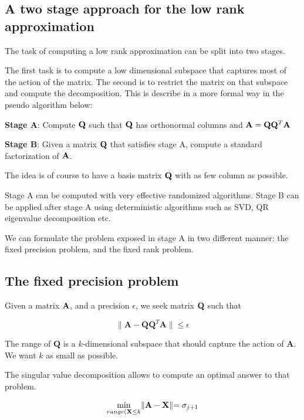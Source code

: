 \documentclass[onecolumn,12pt]{article}
\begin{document}
\subsection{A two stage approach for the low rank approximation}
The task of computing a low rank approximation can be split into two stages.

The first task is to compute a low dimensional subspace that captures most of
the action of the matrix. The second is to restrict the matrix on that subspace
and compute the decomposition. This is describe in a more formal way in the
pseudo algorithm below:

\textbf{Stage A}: Compute $\bold{Q}$ such that $\bold{Q}$ has orthonormal columns and
$\bold{A} = \bold{Q} \bold{Q}^T \bold{A}$

\textbf{Stage B}: Given a matrix $\bold{Q}$ that satisfies stage A, compute a standard
factorization of $\bold{A}$.

The idea is of course to have a basis matrix $\bold{Q}$ with as few column as possible.

Stage A can be computed with very effective randomized algorithms. Stage B can
be applied after stage A using deterministic algorithms such as SVD, QR
eigenvalue decomposition etc.

We can formulate the problem exposed in stage A in two different manner: the
fixed precision problem, and the fixed rank problem.

\subsection{The fixed precision problem}

Given a matrix $\bold{A}$, and a precision $\epsilon$, we seek matrix
$\bold{Q}$ such that

\begin{equation}
\label{fixed-precision-pbm}
\lVert \textbf{A} - \textbf{Q}\textbf{Q}^T \textbf{A} \lVert \leq \epsilon
\end{equation}

The range of $\textbf{Q}$ is a $k$-dimensional subspace that should capture
the action of $\textbf{A}$. We want $k$ as small as possible.

The singular value decomposition allows to compute an optimal answer to that
problem.

\begin{equation}
\label{eckart-young-thm}
\min_{range(\bold{X} \leq k} \lVert \textbf{A} - \textbf{X} \lVert = \sigma_{j + 1}
\end{equation}
\end{document}
